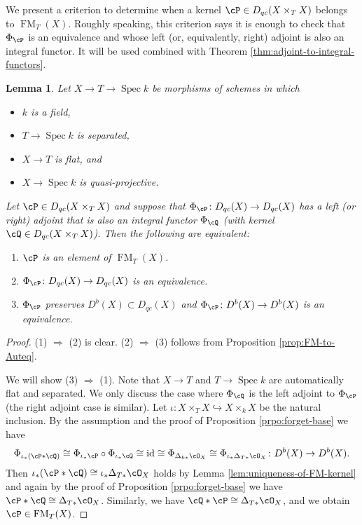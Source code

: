 \documentclass[12pt]{amsart}
\numberwithin{equation}{section}
\theoremstyle{plain}
\newtheorem{lemma}[theorem]{Lemma}
\theoremstyle{definition}
\DeclareMathOperator{\id}{\mathrm{id}}
\DeclareMathOperator{\Spec}{\mathrm{Spec}}
\DeclareMathOperator{\FM}{\mathrm{FM}}
\begin{document}
We present a criterion to determine when a kernel $\cP \in D_{qc}(X \times_T X)$ belongs to $\FM_T(X)$.
Roughly speaking, this criterion says it is enough to check that $\Phi_{\cP}$ is an equivalence and whose left (or, equivalently, right) adjoint is also an integral functor.
It will be used combined with Theorem \ref{thm:adjoint-to-integral-functors}.
\begin{lemma}\label{lem:criterion-for-invertible-kernel}
    Let $X \to T \to \Spec k$ be morphisms of schemes in which
    \begin{itemize}
        \item $k$ is a field,
        \item $T \to \Spec k$ is separated,
        \item $X \to T$ is flat, and
        \item $X \to \Spec k$ is quasi-projective.
    \end{itemize}
    Let $\cP \in D_{qc}(X \times_T X)$ and suppose that $\Phi_{\cP} \colon D_{qc}(X) \to D_{qc}(X)$ has a left (or right) adjoint that is also an integral functor $\Phi_{\cQ}$ (with kernel $\cQ \in D_{qc}(X \times_T X)$).
    Then the following are equivalent:
    \begin{enumerate}
        \item $\cP$ is an element of $\FM_T(X)$.
        \item $\Phi_{\cP} \colon D_{qc}(X) \to D_{qc}(X)$ is an equivalence.
        \item $\Phi_{\cP}$ preserves $D^b(X) \subset D_{qc}(X)$ and $\Phi_{\cP} \colon D^b(X) \to D^b(X)$ is an equivalence.
    \end{enumerate}
\end{lemma}
\begin{proof}
    (1) $\Rightarrow$ (2) is clear.
    (2) $\Rightarrow$ (3) follows from Proposition \ref{prop:FM-to-Auteq}.

    We will show (3) $\Rightarrow$ (1).
    Note that $X \to T$ and $T \to \Spec k$ are automatically flat and separated.
    We only discuss the case where $\Phi_{\cQ}$ is the left adjoint to $\Phi_{\cP}$ (the right adjoint case is similar).
    Let $\iota \colon X \times_T X \hookrightarrow X \times_k X$ be the natural inclusion.
    By the assumption and the proof of Proposition \ref{prpo:forget-base} we have
    \begin{equation}
        \Phi_{\iota_*(\cP * \cQ)} \cong \Phi_{\iota_* \cP} \circ \Phi_{\iota_* \cQ} \cong \id \cong \Phi_{\Delta_{k*}\cO_X} \cong \Phi_{\iota_*\Delta_{T*}\cO_X} \colon D^b(X) \to D^b(X).
    \end{equation}
    Then $\iota_*(\cP * \cQ) \cong \iota_*\Delta_{T*}\cO_X$ holds by Lemma \ref{lem:uniqueness-of-FM-kernel} and again by the proof of Proposition \ref{prpo:forget-base} we have $\cP * \cQ \cong \Delta_{T*}\cO_X$.
    Similarly, we have $\cQ * \cP \cong \Delta_{T*}\cO_X$, and we obtain $\cP \in \FM_T(X)$.
\end{proof}
\end{document}
